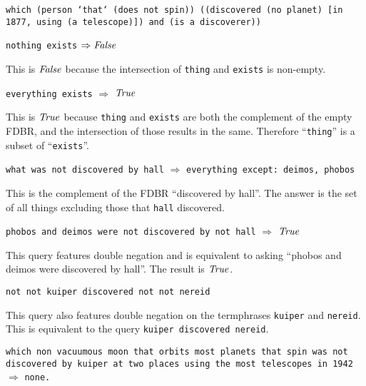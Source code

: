 \documentclass[../main.tex]{subfiles}
\begin{document}
\begin{refsection}
\examplespacing

\texttt{which (person `that` (does not spin)) ((discovered (no planet) [in 1877, using (a telescope)]) and (is a discoverer))}

\examplespacing

\texttt{nothing exists} $\Rightarrow \mathit{False}$

\examplespacing

\noindent This is $\mathit{False}$ because the intersection of \texttt{thing} and \texttt{exists} is non-empty.

\examplespacing

\texttt{everything exists} $\Rightarrow$ $\mathit{True}$

\examplespacing

\noindent This is $\mathit{True}$ because \texttt{thing} and \texttt{exists} are both the complement of the empty FDBR, and the intersection of those results in the same.  Therefore ``\texttt{thing}'' is a subset of ``\texttt{exists}''.

\examplespacing

\texttt{what was not discovered by hall} $\Rightarrow$ \texttt{everything except: deimos, phobos}

\examplespacing

\noindent This is the complement of the FDBR ``discovered by hall''.  The answer is the set of all things excluding those that \texttt{hall} discovered.

\examplespacing

\texttt{phobos and deimos were not discovered by not hall} $\Rightarrow$ $\mathit{True}$

\examplespacing

\noindent This query features double negation and is equivalent to asking ``phobos and deimos were discovered by hall''.  The result is $\mathit{True}$.

\examplespacing

\texttt{not not kuiper discovered not not nereid}

\examplespacing

\noindent This query also features double negation on the termphrases \texttt{kuiper} and \texttt{nereid}.
This is equivalent to the query \texttt{kuiper discovered nereid}.

\examplespacing

\texttt{which non vacuumous moon that orbits most planets that spin was not discovered by kuiper at two places using the most telescopes in 1942} $\Rightarrow$ \texttt{none.}


\end{refsection}
\end{document}
